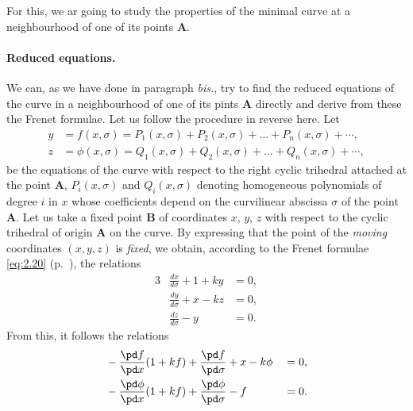 For this, we ar going to study the properties of the minimal curve at a neighbourhood of one of its points $\mathbf{A}$.


\paragraph{Reduced equations.}
\label{sec:39}
We can, as we have done in paragraph \textit{bis.}, try to find the reduced equations of the curve in a neighbourhood of one of its pints $\mathbf{A}$ directly and derive from these the Frenet formulae. Let us follow the procedure in reverse here. Let
\begin{align*}
  y&=f(x,\sigma)=P_{1}(x,\sigma)+P_{2}(x,\sigma)+\dots+P_{n}(x,\sigma)+\cdots,\\
  z&=\phi(x,\sigma)=Q_{1}(x,\sigma)+Q_{2}(x,\sigma)+\dots+Q_{n}(x,\sigma)+\cdots,
\end{align*}
be the equations of the curve with respect to the right cyclic trihedral attached at the point $\mathbf{A}$, $P_{i}(x,\sigma)$ and $Q_{i}(x,\sigma)$ denoting homogeneous polynomials of degree $i$ in $x$ whose coefficients depend on the curvilinear abscissa $\sigma$ of the point $\mathbf{A}$. Let us take a fixed point $\mathbf{B}$ of coordinates $x$, $y$, $z$ with respect to the cyclic trihedral of origin $\mathbf{A}$ on the curve. By expressing that the point of the \emph{moving} coordinates $(x,y,z)$ is \emph{fixed}, we obtain, according to the Frenet formulae \eqref{eq:2.20} (p.~\pageref{eq:2.20}), the relations
\begin{alignat*}{3}
  &\frac{dx}{d\sigma}+1+ky&{}={}0,\\
  &\frac{dy}{d\sigma}+x-kz&{}={}0,\\
  &\frac{dz}{d\sigma}-y&{}={}0.
\end{alignat*}
From this, it follows the relations
\begin{alignat*}{3}
  &-\frac{\pd f}{\pd x}(1+kf)+\frac{\pd f}{\pd\sigma}+x-k\phi&{}=0,\\
  &-\frac{\pd \phi}{\pd x}(1+kf)+\frac{\pd \phi}{\pd\sigma}-f&{}=0.  
\end{alignat*}

